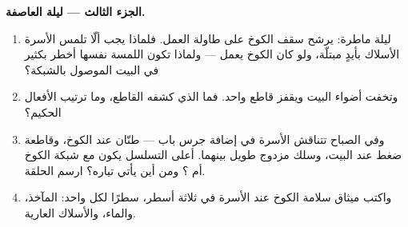 \begin{problem}
\medskip\noindent\textbf{الجزء الثالث --- ليلة العاصفة.}
\begin{enumerate}[resume]
  \item ليلة ماطرة: يرشح سقف الكوخ على طاولة العمل. فلماذا يجب
        ألّا تلمس الأسرة الأسلاك بأيدٍ مبتلّة، ولو كان الكوخ
        يعمل  --- ولماذا تكون اللمسة نفسها أخطر بكثير في
        البيت الموصول بالشبكة؟
  \item وتخفت أضواء البيت ويقفز قاطع واحد. فما الذي كشفه
        القاطع، وما ترتيب الأفعال الحكيم؟
  \item وفي الصباح تتناقش الأسرة في إضافة جرس باب --- طنّان عند
        الكوخ، وقاطعة ضغط عند البيت، وسلك مزدوج طويل بينهما.
        أعلى التسلسل يكون مع شبكة الكوخ أم ؟ ومن أين
        يأتي تياره؟ ارسم الحلقة.
  \item واكتب ميثاق سلامة الكوخ عند الأسرة في ثلاثة أسطر، سطرًا
        لكل واحد: المآخذ، والماء، والأسلاك العارية.
\end{enumerate}
\end{problem}
